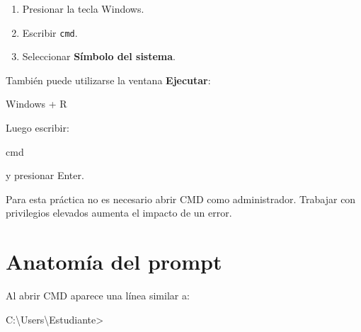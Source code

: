 \documentclass[
  spanish,
  letterpaper,
]{scrbook}
\newenvironment{Shaded}{\begin{snugshade}}{\end{snugshade}}
\newcommand{\NormalTok}[1]{\textcolor[rgb]{0.00,0.23,0.31}{#1}}
\providecommand{\tightlist}{%
  \setlength{\itemsep}{0pt}\setlength{\parskip}{0pt}}
\begin{document}
\begin{enumerate}
\def\labelenumi{\arabic{enumi}.}
\tightlist
\item
  Presionar la tecla Windows.
\item
  Escribir \texttt{cmd}.
\item
  Seleccionar \textbf{Símbolo del sistema}.
\end{enumerate}

También puede utilizarse la ventana \textbf{Ejecutar}:

\begin{Shaded}
\begin{Highlighting}[]
\NormalTok{Windows + R}
\end{Highlighting}
\end{Shaded}

Luego escribir:

\begin{Shaded}
\begin{Highlighting}[]
\NormalTok{cmd}
\end{Highlighting}
\end{Shaded}

y presionar Enter.

\begin{tcolorbox}[enhanced jigsaw, arc=.35mm, bottomrule=.15mm, bottomtitle=1mm, breakable, colback=white, colbacktitle=quarto-callout-warning-color!10!white, colframe=quarto-callout-warning-color-frame, coltitle=black, left=2mm, leftrule=.75mm, opacityback=0, opacitybacktitle=0.6, rightrule=.15mm, title=\textcolor{quarto-callout-warning-color}{\faExclamationTriangle}\hspace{0.5em}{Permisos administrativos}, titlerule=0mm, toprule=.15mm, toptitle=1mm]

Para esta práctica no es necesario abrir CMD como administrador.
Trabajar con privilegios elevados aumenta el impacto de un error.

\end{tcolorbox}


\chapter{Anatomía del prompt}\label{anatomuxeda-del-prompt}

Al abrir CMD aparece una línea similar a:

\begin{Shaded}
\begin{Highlighting}[]
\NormalTok{C:\textbackslash{}Users\textbackslash{}Estudiante\textgreater{}}
\end{Highlighting}
\end{Shaded}
\end{document}
